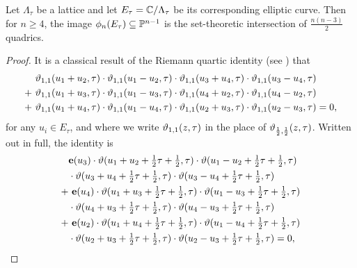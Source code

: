 \begin{theorem}
	\label{quadric_existence_theorem}
	Let $\Lambda_{\tau}$ be a lattice and let $E_{\tau} = \mathbb{C}/\Lambda_{\tau}$ be its corresponding elliptic curve. Then for $n\geq 4$, the image $\phi_{n}(E_{\tau}) \subseteq\mathbb{P}^{n-1}$ is the set-theoretic intersection of $\tfrac{n(n-3)}{2}$ quadrics.
\end{theorem}

\begin{proof}
	It is a classical result of the Riemann quartic identity (see \cite{Krazer_1890,Tracy_1985}) that
	\begin{equation}
	\label{riemann_quartic}
	\begin{split}
	&\ \vartheta_{1,1}(u_{1} + u_{2},\tau)\cdot\vartheta_{1,1}(u_{1}-u_{2},\tau)\cdot\vartheta_{1,1}(u_{3}+u_{4},\tau)\cdot\vartheta_{1,1}(u_{3}-u_{4},\tau)\\
	+ &\ \vartheta_{1,1}(u_{1} + u_{3},\tau)\cdot\vartheta_{1,1}(u_{1} - u_{3},\tau)\cdot\vartheta_{1,1}(u_{4} + u_{2},\tau)\cdot\vartheta_{1,1}(u_{4} - u_{2},\tau)\\
	+ &\ \vartheta_{1,1}(u_{1} + u_{4},\tau)\cdot\vartheta_{1,1}(u_{1}-u_{4},\tau)\cdot\vartheta_{1,1}(u_{2} + u_{3},\tau)\cdot\vartheta_{1,1}(u_{2}- u_{3},\tau) = 0,
	\end{split}
	\end{equation}
	for any $u_{i}\in E_{\tau}$, and where we write $\vartheta_{1,1}(z,\tau)$ in the place of $\vartheta_{\frac{1}{2},\frac{1}{2}}(z,\tau)$. Written out in full, the identity is
	\begin{equation}
	\begin{split}
	& \be(u_{3})\cdot\vt(u_{1} + u_{2} + \tfrac{1}{2}\tau + \tfrac{1}{2},\tau)\cdot\vt(u_{1} - u_{2} + \tfrac{1}{2}\tau + \tfrac{1}{2},\tau)\\
	&\cdot \vt(u_{3} + u_{4} + \tfrac{1}{2}\tau + \tfrac{1}{2},\tau)\cdot\vt(u_{3} - u_{4} + \tfrac{1}{2}\tau + \tfrac{1}{2},\tau)\\
	+&\ \be(u_{4})\cdot\vt(u_{1} + u_{3} + \tfrac{1}{2}\tau + \tfrac{1}{2},\tau)\cdot\vt(u_{1} - u_{3} + \tfrac{1}{2}\tau + \tfrac{1}{2},\tau)\\
	&\cdot\vt(u_{4} + u_{3} + \tfrac{1}{2}\tau + \tfrac{1}{2},\tau)\cdot \vt(u_{4} - u_{3} + \tfrac{1}{2}\tau + \tfrac{1}{2},\tau)\\
	+&\ \be(u_{2})\cdot\vt(u_{1} + u_{4} + \tfrac{1}{2}\tau + \tfrac{1}{2},\tau)\cdot\vt(u_{1} - u_{4} + \tfrac{1}{2}\tau + \tfrac{1}{2},\tau)\\
	&\cdot\vt(u_{2} + u_{3} + \tfrac{1}{2}\tau + \tfrac{1}{2},\tau)\cdot\vt(u_{2} - u_{3} + \tfrac{1}{2}\tau + \tfrac{1}{2},\tau) = 0,

\end{split}
\end{equation}
\end{proof}
